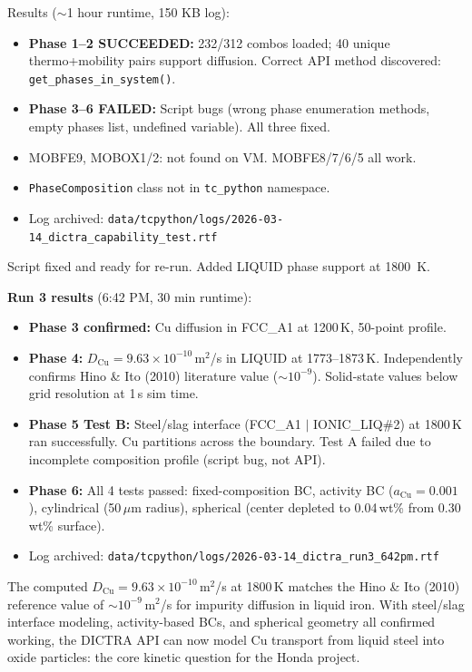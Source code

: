 \documentclass[11pt]{article}
\begin{document}
Results ($\sim$1 hour runtime, 150 KB log):
\begin{itemize}[leftmargin=*]
    \item \textbf{Phase 1--2 SUCCEEDED:} 232/312 combos loaded; 40 unique thermo+mobility pairs support diffusion. Correct API method discovered: \texttt{get\_phases\_in\_system()}.
    \item \textbf{Phase 3--6 FAILED:} Script bugs (wrong phase enumeration methods, empty phases list, undefined variable). All three fixed.
    \item MOBFE9, MOBOX1/2: not found on VM. MOBFE8/7/6/5 all work.
    \item \texttt{PhaseComposition} class not in \texttt{tc\_python} namespace.
    \item Log archived: \texttt{data/tcpython/logs/2026-03-14\_dictra\_capability\_test.rtf}
\end{itemize}

Script fixed and ready for re-run. Added LIQUID phase support at \SI{1800}{\kelvin}.

\textbf{Run 3 results} (6:42 PM, 30 min runtime):
\begin{itemize}[leftmargin=*]
    \item \textbf{Phase 3 confirmed:} Cu diffusion in FCC\_A1 at 1200\,K, 50-point profile.
    \item \textbf{Phase 4:} $D_{\text{Cu}} = 9.63 \times 10^{-10}$\,m$^2$/s in LIQUID at 1773--1873\,K. Independently confirms Hino \& Ito (2010) literature value ($\sim 10^{-9}$). Solid-state values below grid resolution at 1\,s sim time.
    \item \textbf{Phase 5 Test B:} Steel/slag interface (FCC\_A1 $|$ IONIC\_LIQ\#2) at 1800\,K ran successfully. Cu partitions across the boundary. Test A failed due to incomplete composition profile (script bug, not API).
    \item \textbf{Phase 6:} All 4 tests passed: fixed-composition BC, activity BC ($a_{\text{Cu}} = 0.001$), cylindrical (50\,$\mu$m radius), spherical (center depleted to 0.04\,wt\% from 0.30\,wt\% surface).
    \item Log archived: \texttt{data/tcpython/logs/2026-03-14\_dictra\_run3\_642pm.rtf}
\end{itemize}

\begin{insight}
The computed $D_{\text{Cu}} = 9.63 \times 10^{-10}$\,m$^2$/s at 1800\,K matches the Hino \& Ito (2010) reference value of $\sim 10^{-9}$\,m$^2$/s for impurity diffusion in liquid iron. With steel/slag interface modeling, activity-based BCs, and spherical geometry all confirmed working, the DICTRA API can now model Cu transport from liquid steel into oxide particles: the core kinetic question for the Honda project.
\end{insight}
\end{document}
